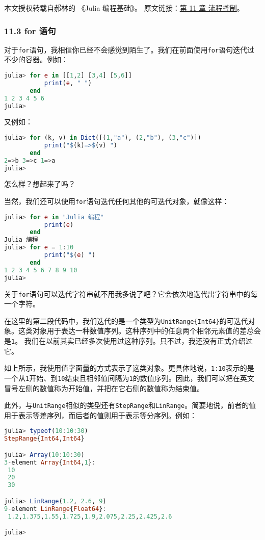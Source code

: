 
本文授权转载自郝林的 《Julia 编程基础》。 原文链接：\href{https://github.com/hyper0x/JuliaBasics/blob/master/book/ch11.md}{第 11 章 流程控制}。


\subsubsection{11.3 for 语句}

对于\verb`for`语句，我相信你已经不会感觉到陌生了。我们在前面使用\verb`for`语句迭代过不少的容器。例如：
\begin{lstlisting}[language=julia]
julia> for e in [[1,2] [3,4] [5,6]]
           print(e, " ")
       end
1 2 3 4 5 6 
julia> 
\end{lstlisting}

又例如：
\begin{lstlisting}[language=julia]
julia> for (k, v) in Dict([(1,"a"), (2,"b"), (3,"c")])
           print("$(k)=>$(v) ")
       end
2=>b 3=>c 1=>a 
julia> 
\end{lstlisting}

怎么样？想起来了吗？

当然，我们还可以使用\verb|for|语句迭代任何其他的可迭代对象，就像这样：
\begin{lstlisting}[language=julia]
julia> for e in "Julia 编程"
           print(e)
       end
Julia 编程
julia> for e = 1:10
           print("$(e) ")
       end
1 2 3 4 5 6 7 8 9 10 
julia> 
\end{lstlisting}

关于\verb|for|语句可以迭代字符串就不用我多说了吧？它会依次地迭代出字符串中的每一个字符。

在这里的第二段代码中，我们迭代的是一个类型为\verb|UnitRange{Int64}|的可迭代对象。这类对象用于表达一种数值序列。这种序列中的任意两个相邻元素值的差总会是\verb`1`。
我们在以前其实已经多次使用过这种序列。只不过，我还没有正式介绍过它。

如上所示，我使用值字面量的方式表示了这类对象。更具体地说，\verb|1:10|表示的是一个从\verb|1|开始、到\verb|10|结束且相邻值间隔为\verb|1|的数值序列。因此，我们可以把在英文冒号左侧的数值称为开始值，并把在它右侧的数值称为结束值。

此外，与\verb|UnitRange|相似的类型还有\verb|StepRange|和\verb|LinRange|。简要地说，前者的值用于表示等差序列，而后者的值则用于表示等分序列。例如：
\begin{lstlisting}[language=julia]
julia> typeof(10:10:30)
StepRange{Int64,Int64}

julia> Array(10:10:30)
3-element Array{Int64,1}:
 10
 20
 30

julia> LinRange(1.2, 2.6, 9)
9-element LinRange{Float64}:
 1.2,1.375,1.55,1.725,1.9,2.075,2.25,2.425,2.6

julia> 
\end{lstlisting}

